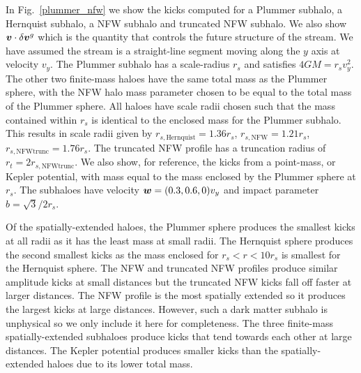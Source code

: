 \documentclass[useAMS,usenatbib,fleqn,a4paper]{mn2e}
\newcommand{\bs}[1]{\bmath{#1}}
\begin{document}
In Fig.~\ref{plummer_nfw} we show the kicks computed for a Plummer subhalo, a Hernquist subhalo, a NFW subhalo and truncated NFW subhalo. We also show $\bs{v}\cdot\delta\bs{v}^g$ which is the quantity that controls the future structure of the stream. We have assumed the stream is a straight-line segment moving along the $y$ axis at velocity $v_y$. The Plummer subhalo has a scale-radius $r_s$ and satisfies $4GM=r_sv_y^2$. The other two finite-mass haloes have the same total mass as the Plummer sphere, with the NFW halo mass parameter chosen to be equal to the total mass of the Plummer sphere. All haloes have scale radii chosen such that the mass contained within $r_s$ is identical to the enclosed mass for the Plummer subhalo. This results in scale radii given by $r_{s,\mathrm{Hernquist}}=1.36r_s$, $r_{s,\mathrm{NFW}}=1.21r_s$, $r_{s,\mathrm{NFW trunc}}=1.76r_s$. The truncated NFW profile has a truncation radius of $r_t=2r_{s,\mathrm{NFW trunc}}$. We also show, for reference, the kicks from a point-mass, or Kepler potential, with mass equal to the mass enclosed by the Plummer sphere at $r_s$. The subhaloes have velocity $\bs{w}=(0.3,0.6,0)v_y$ and impact parameter $b=\sqrt{3}/2r_s$.

Of the spatially-extended haloes, the Plummer sphere produces the smallest kicks at all radii as it has the least mass at small radii. The Hernquist sphere produces the second smallest kicks as the mass enclosed for $r_s<r<10r_s$ is smallest for the Hernquist sphere. The NFW and truncated NFW profiles produce similar amplitude kicks at small distances but the truncated NFW kicks fall off faster at larger distances. The NFW profile is the most spatially extended so it produces the largest kicks at large distances. However, such a dark matter subhalo is unphysical so we only include it here for completeness. The three finite-mass spatially-extended subhaloes produce kicks that tend towards each other at large distances. The Kepler potential produces smaller kicks than the spatially-extended haloes due to its lower total mass.
\end{document}
